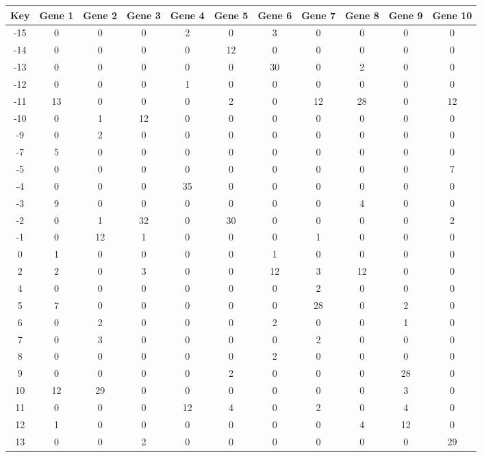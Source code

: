\begin{tabular}{|c|c|c|c|c|c|c|c|c|c|c|}
\hline
Key & Gene 1 & Gene 2 & Gene 3 & Gene 4 & Gene 5 & Gene 6 & Gene 7 & Gene 8 & Gene 9 & Gene 10 \\
\hline
-15 & 0 & 0 & 0 & 2 & 0 & 3 & 0 & 0 & 0 & 0 \\
-14 & 0 & 0 & 0 & 0 & 12 & 0 & 0 & 0 & 0 & 0 \\
-13 & 0 & 0 & 0 & 0 & 0 & 30 & 0 & 2 & 0 & 0 \\
-12 & 0 & 0 & 0 & 1 & 0 & 0 & 0 & 0 & 0 & 0 \\
-11 & 13 & 0 & 0 & 0 & 2 & 0 & 12 & 28 & 0 & 12 \\
-10 & 0 & 1 & 12 & 0 & 0 & 0 & 0 & 0 & 0 & 0 \\
-9 & 0 & 2 & 0 & 0 & 0 & 0 & 0 & 0 & 0 & 0 \\
-7 & 5 & 0 & 0 & 0 & 0 & 0 & 0 & 0 & 0 & 0 \\
-5 & 0 & 0 & 0 & 0 & 0 & 0 & 0 & 0 & 0 & 7 \\
-4 & 0 & 0 & 0 & 35 & 0 & 0 & 0 & 0 & 0 & 0 \\
-3 & 9 & 0 & 0 & 0 & 0 & 0 & 0 & 4 & 0 & 0 \\
-2 & 0 & 1 & 32 & 0 & 30 & 0 & 0 & 0 & 0 & 2 \\
-1 & 0 & 12 & 1 & 0 & 0 & 0 & 1 & 0 & 0 & 0 \\
0 & 1 & 0 & 0 & 0 & 0 & 1 & 0 & 0 & 0 & 0 \\
2 & 2 & 0 & 3 & 0 & 0 & 12 & 3 & 12 & 0 & 0 \\
4 & 0 & 0 & 0 & 0 & 0 & 0 & 2 & 0 & 0 & 0 \\
5 & 7 & 0 & 0 & 0 & 0 & 0 & 28 & 0 & 2 & 0 \\
6 & 0 & 2 & 0 & 0 & 0 & 2 & 0 & 0 & 1 & 0 \\
7 & 0 & 3 & 0 & 0 & 0 & 0 & 2 & 0 & 0 & 0 \\
8 & 0 & 0 & 0 & 0 & 0 & 2 & 0 & 0 & 0 & 0 \\
9 & 0 & 0 & 0 & 0 & 2 & 0 & 0 & 0 & 28 & 0 \\
10 & 12 & 29 & 0 & 0 & 0 & 0 & 0 & 0 & 3 & 0 \\
11 & 0 & 0 & 0 & 12 & 4 & 0 & 2 & 0 & 4 & 0 \\
12 & 1 & 0 & 0 & 0 & 0 & 0 & 0 & 4 & 12 & 0 \\
13 & 0 & 0 & 2 & 0 & 0 & 0 & 0 & 0 & 0 & 29 \\
\hline
\end{tabular}